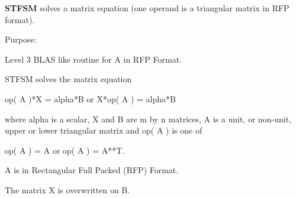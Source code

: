 {\bfseries S\+T\+F\+S\+M} solves a matrix equation (one operand is a triangular matrix in R\+F\+P format). 

 \begin{DoxyParagraph}{Purpose\+: }
\begin{DoxyVerb} Level 3 BLAS like routine for A in RFP Format.

 STFSM  solves the matrix equation

    op( A )*X = alpha*B  or  X*op( A ) = alpha*B

 where alpha is a scalar, X and B are m by n matrices, A is a unit, or
 non-unit,  upper or lower triangular matrix  and  op( A )  is one  of

    op( A ) = A   or   op( A ) = A**T.

 A is in Rectangular Full Packed (RFP) Format.

 The matrix X is overwritten on B.\end{DoxyVerb}
 
\end{DoxyParagraph}

